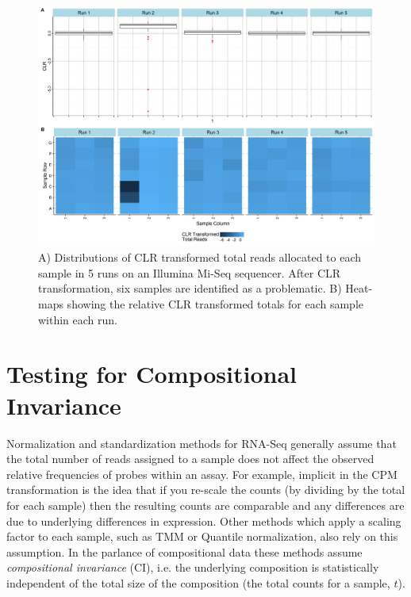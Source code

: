 \begin{figure}
\includegraphics[scale=.5]{./Figures/IO_Repro_Combined_CLR}
\caption{A) Distributions of CLR transformed total reads allocated to each sample in 5 runs on an Illumina Mi-Seq sequencer. After CLR transformation, six samples are identified as a problematic. B) Heat-maps showing the relative CLR transformed totals for each sample within each run.}
\label{clrFig}
\end{figure}

\FloatBarrier
\section{Testing for Compositional Invariance}




Normalization and standardization methods for RNA-Seq generally assume that the total number of reads assigned to a sample does not affect the observed relative frequencies of probes within an assay.  For example, implicit in the CPM transformation is the idea that if you re-scale the counts (by dividing by the total for each sample) then the resulting counts are comparable and any differences are due to underlying differences in expression.  Other methods which apply a scaling factor to each sample, such as TMM or Quantile normalization, also rely on this assumption.  In the parlance of compositional data these methods assume \emph{compositional invariance} (CI), i.e. the underlying composition is statistically independent of the total size of the composition (the total counts for a sample, $t$).

